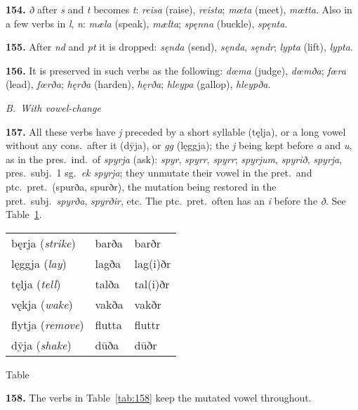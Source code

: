 \documentclass[12pt,letterpaper]{book}
\newcommand\newcaption{\small\refstepcounter{table}%
	\centering Table~\thetable}
\begin{document}
\textbf{154.} \textit{ð} after \textit{s} and \textit{t} becomes \textit{t}: \textit{reisa}
(raise), \textit{reista}; \textit{mœta} (meet), \textit{mœtta}.  Also in a few
verbs in \textit{l}, \textit{n}: \textit{mæla} (speak), \textit{mælta};
\textit{spęnna} (buckle), \textit{spęnta}.

\textbf{155.} After \textit{nd} and \textit{pt} it is dropped: \textit{sęnda} (send),
\textit{sęnda}, \textit{sęndr}; \textit{lypta} (lift), \textit{lypta}.

\textbf{156.} It is preserved in such verbs as the following: \textit{dœma}
(judge), \textit{dœmða}; \textit{fœra} (lead), \textit{fœrða}; \textit{hęrða}
(harden), \textit{hęrða}; \textit{hleypa} (gallop), \textit{hleypða}.

\begin{center}
\textit{B.\ With vowel-change}
\end{center}

\textbf{157.} All these verbs have \textit{j} preceded by a short syllable
(tęlja), or a long vowel without any cons.\ after it (dȳja), or
\textit{gg} (lęggja); the \textit{j} being kept before \textit{a} and
\textit{u}, as in the pres.\ ind.\ of \textit{spyrja} (ask): \textit{spyr},
\textit{spyrr}, \textit{spyrr}; \textit{spyrjum}, \textit{spyrið},
\textit{spyrja}, pres.\ subj.\ 1 sg.\ \textit{ek spyrja}; they unmutate
their vowel in the pret.\ and ptc.\ pret.\ (spurða, spurðr), the
mutation being restored in the pret.\ subj.\ \textit{spyrða},
\textit{spyrðir}, etc.  The ptc.\ pret.\ often has an \textit{i} before the
\textit{ð}.  See Table~\ref{tab:157}.

\begin{table}[htbp]
\begin{center}
\begin{tabular}{lll}
	bęrja (\textit{strike}) & barða & barðr \\
	lęggja (\textit{lay}) & lagða & lag(i)ðr \\
	tęlja (\textit{tell}) & talða & tal(i)ðr \\
	vękja (\textit{wake}) & vakða & vakðr \\
	flytja (\textit{remove}) & flutta & fluttr \\
	dȳja (\textit{shake}) & dūða & dūðr \\
\end{tabular}
\end{center}
\newcaption
\label{tab:157}
\end{table}

\textbf{158.} The verbs in Table~\ref{tab:158} keep the mutated vowel
throughout.
\end{document}
